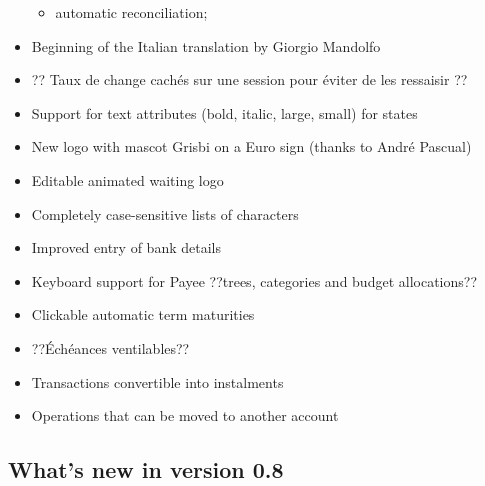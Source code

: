\begin{itemize}
\begin{itemize}
\item automatic reconciliation;

\end{itemize}

\item Beginning of the Italian translation by Giorgio Mandolfo

\item ?? Taux de change cachés sur une session pour éviter de les ressaisir ??

\item Support for text attributes (bold, italic, large, small) for states

\item New logo with mascot Grisbi on a Euro sign (thanks to André Pascual)

\item Editable animated waiting logo

\item Completely case-sensitive lists of characters

\item Improved entry of bank details

\item Keyboard support for Payee ??trees, categories and budget allocations??

\item Clickable automatic term maturities

\item ??Échéances ventilables??

\item Transactions convertible into instalments

\item Operations that can be moved to another account

\end{itemize}

\subsection{What's new in version 0.8}

